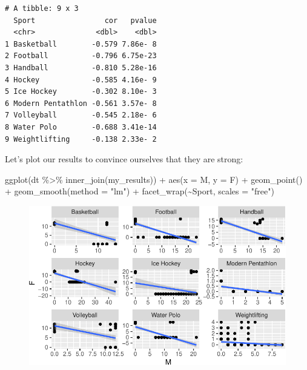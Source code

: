 \documentclass[
  letterpaper,
  DIV=11,
  numbers=noendperiod]{scrreprt}
\newenvironment{Shaded}{\begin{snugshade}}{\end{snugshade}}
\newcommand{\AttributeTok}[1]{\textcolor[rgb]{0.40,0.45,0.13}{#1}}
\newcommand{\FunctionTok}[1]{\textcolor[rgb]{0.28,0.35,0.67}{#1}}
\newcommand{\NormalTok}[1]{\textcolor[rgb]{0.00,0.23,0.31}{#1}}
\newcommand{\SpecialCharTok}[1]{\textcolor[rgb]{0.37,0.37,0.37}{#1}}
\newcommand{\StringTok}[1]{\textcolor[rgb]{0.13,0.47,0.30}{#1}}
\begin{document}
\begin{verbatim}
# A tibble: 9 x 3
  Sport                cor   pvalue
  <chr>              <dbl>    <dbl>
1 Basketball        -0.579 7.86e- 8
2 Football          -0.796 6.75e-23
3 Handball          -0.810 5.28e-16
4 Hockey            -0.585 4.16e- 9
5 Ice Hockey        -0.302 8.10e- 3
6 Modern Pentathlon -0.561 3.57e- 8
7 Volleyball        -0.545 2.18e- 6
8 Water Polo        -0.688 3.41e-14
9 Weightlifting     -0.138 2.33e- 2
\end{verbatim}

Let's plot our results to convince ourselves that they are strong:

\begin{Shaded}
\begin{Highlighting}[]
\FunctionTok{ggplot}\NormalTok{(dt }\SpecialCharTok{\%\textgreater{}\%} \FunctionTok{inner\_join}\NormalTok{(my\_results)) }\SpecialCharTok{+} 
  \FunctionTok{aes}\NormalTok{(}\AttributeTok{x =} \StringTok{\textasciigrave{}}\AttributeTok{M}\StringTok{\textasciigrave{}}\NormalTok{, }\AttributeTok{y =} \StringTok{\textasciigrave{}}\AttributeTok{F}\StringTok{\textasciigrave{}}\NormalTok{) }\SpecialCharTok{+} 
  \FunctionTok{geom\_point}\NormalTok{() }\SpecialCharTok{+} 
  \FunctionTok{geom\_smooth}\NormalTok{(}\AttributeTok{method =} \StringTok{"lm"}\NormalTok{) }\SpecialCharTok{+} 
  \FunctionTok{facet\_wrap}\NormalTok{(}\SpecialCharTok{\textasciitilde{}}\NormalTok{Sport, }\AttributeTok{scales =} \StringTok{"free"}\NormalTok{)}
\end{Highlighting}
\end{Shaded}

\begin{figure}[H]

{\centering \includegraphics{./05-hypothesis_files/figure-pdf/unnamed-chunk-16-1.pdf}

}

\end{figure}
\end{document}
